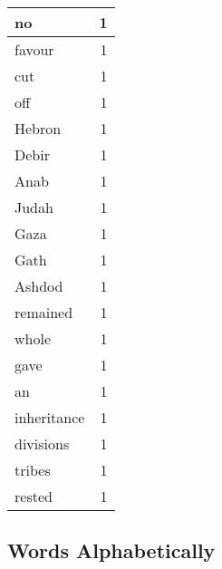 \begin{center}
\begin{longtable}{l|r}
no & 1 \\ \hline
favour & 1 \\ \hline
cut & 1 \\ \hline
off & 1 \\ \hline
Hebron & 1 \\ \hline
Debir & 1 \\ \hline
Anab & 1 \\ \hline
Judah & 1 \\ \hline
Gaza & 1 \\ \hline
Gath & 1 \\ \hline
Ashdod & 1 \\ \hline
remained & 1 \\ \hline
whole & 1 \\ \hline
gave & 1 \\ \hline
an & 1 \\ \hline
inheritance & 1 \\ \hline
divisions & 1 \\ \hline
tribes & 1 \\ \hline
rested & 1 \\ \hline
\end{longtable}
\end{center}



\normalsize



\subsection{Words Alphabetically}

